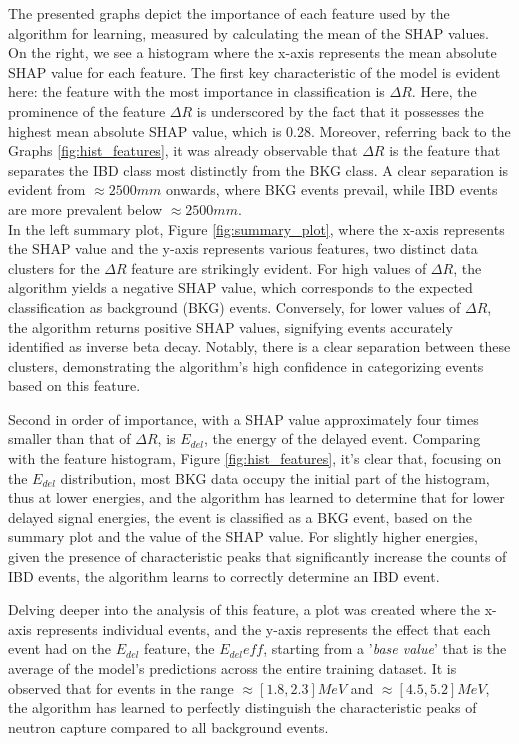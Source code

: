 The presented graphs depict the importance of each feature used by the algorithm for learning, measured by calculating the mean of the SHAP values. On the right, we see a histogram where the x-axis represents the mean absolute SHAP value for each feature. The first key characteristic of the model is evident here: the feature with the most importance in classification is $\Delta R$. Here, the prominence of the feature $\Delta R$ is underscored by the fact that it possesses the highest mean absolute SHAP value, which is 0.28. Moreover, referring back to the Graphs \ref{fig:hist_features}, it was already observable that $\Delta R$ is the feature that separates the IBD class most distinctly from the BKG class. A clear separation is evident from $\approx 2500 mm$ onwards, where BKG events prevail, while IBD events are more prevalent below $\approx 2500 mm$. \\

In the left summary plot, Figure \ref{fig:summary_plot}, where the x-axis represents the SHAP value and the y-axis represents various features, two distinct data clusters for the \(\Delta R\) feature are strikingly evident. For high values of \(\Delta R\), the algorithm yields a negative SHAP value, which corresponds to the expected classification as background (BKG) events. Conversely, for lower values of \(\Delta R\), the algorithm returns positive SHAP values, signifying events accurately identified as inverse beta decay. Notably, there is a clear separation between these clusters, demonstrating the algorithm's high confidence in categorizing events based on this feature.

Second in order of importance, with a SHAP value approximately four times smaller than that of $\Delta R$, is $E_{del}$, the energy of the delayed event. Comparing with the feature histogram, Figure \ref{fig:hist_features}, it's clear that, focusing on the $E_{del}$ distribution, most BKG data occupy the initial part of the histogram, thus at lower energies, and the algorithm has learned to determine that for lower delayed signal energies, the event is classified as a BKG event, based on the summary plot and the value of the SHAP value. For slightly higher energies, given the presence of characteristic peaks that significantly increase the counts of IBD events, the algorithm learns to correctly determine an IBD event. 

Delving deeper into the analysis of this feature, a plot was created where the x-axis represents individual events, and the y-axis represents the effect that each event had on the $E_{del}$ feature, the $E_{del} eff$, starting from a '\textit{base value}' that is the average of the model's predictions across the entire training dataset. It is observed that for events in the range $\approx[1.8, 2.3] MeV$ and $\approx[4.5, 5.2] MeV$, the algorithm has learned to perfectly distinguish the characteristic peaks of neutron capture compared to all background events. 

